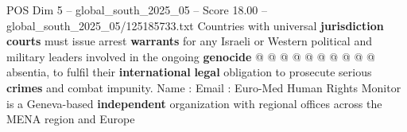 \begin{textsample}{POS Dim 5 – global\_south\_2025\_05 – Score 18.00 – global\_south\_2025\_05/125185733.txt}
Countries with universal \textbf{jurisdiction} \textbf{courts} must issue arrest \textbf{warrants} for any Israeli or Western political and military leaders involved in the ongoing \textbf{genocide} @ @ @ @ @ @ @ @ @ @ absentia, to fulfil their \textbf{international} \textbf{legal} obligation to prosecute serious \textbf{crimes} and combat impunity.
Name : Email : Euro-Med Human Rights Monitor is a Geneva-based \textbf{independent} organization with regional offices across the MENA region and Europe

\end{textsample}
